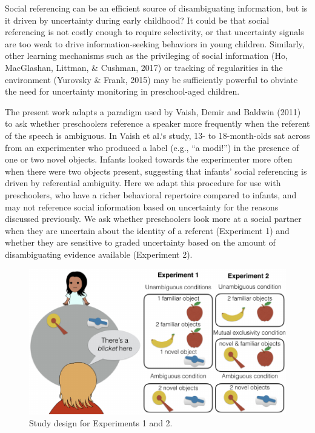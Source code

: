 \documentclass[10pt, letterpaper]{article}
\newenvironment{CodeChunk}{}{}
\begin{document}
Social referencing can be an efficient source of disambiguating
information, but is it driven by uncertainty during early childhood? It
could be that social referencing is not costly enough to require
selectivity, or that uncertainty signals are too weak to drive
information-seeking behaviors in young children. Similarly, other
learning mechanisms such as the privileging of social information (Ho,
MacGlashan, Littman, \& Cushman, 2017) or tracking of regularities in
the environment (Yurovsky \& Frank, 2015) may be sufficiently powerful
to obviate the need for uncertainty monitoring in preschool-aged
children.

The present work adapts a paradigm used by Vaish, Demir and Baldwin
(2011) to ask whether preschoolers reference a speaker more frequently
when the referent of the speech is ambiguous. In Vaish et al.`s study,
13- to 18-month-olds sat across from an experimenter who produced a
label (e.g., ``a modi!'') in the presence of one or two novel objects.
Infants looked towards the experimenter more often when there were two
objects present, suggesting that infants' social referencing is driven
by referential ambiguity. Here we adapt this procedure for use with
preschoolers, who have a richer behavioral repertoire compared to
infants, and may not reference social information based on uncertainty
for the reasons discussed previously. We ask whether preschoolers look
more at a social partner when they are uncertain about the identity of a
referent (Experiment 1) and whether they are sensitive to graded
uncertainty based on the amount of disambiguating evidence available
(Experiment 2).

\begin{CodeChunk}
\captionsetup{width=0.8\columnwidth}\begin{figure}[h]

{\centering \includegraphics{figs/design-1} 

}

\caption[Study design for Experiments 1 and 2]{Study design for Experiments 1 and 2.}\label{fig:design}
\end{figure}
\end{CodeChunk}
\end{document}
